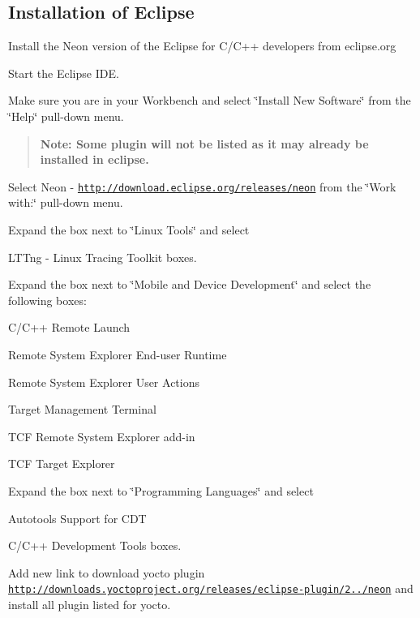 \subsection*{Installation of Eclipse}


\begin{DoxyItemize}
\item Install the Neon version of the Eclipse for C/\+C++ developers from eclipse.\+org
\item Start the Eclipse I\+DE.
\item Make sure you are in your Workbench and select \char`\"{}\+Install New Software\char`\"{} from the \char`\"{}\+Help\char`\"{} pull-\/down menu. \begin{quote}
{\bfseries Note\+: Some plugin will not be listed as it may already be installed in eclipse.} \end{quote}

\item Select Neon -\/ \href{http://download.eclipse.org/releases/neon}{\tt http\+://download.\+eclipse.\+org/releases/neon} from the \char`\"{}\+Work with\+:\char`\"{} pull-\/down menu.
\item Expand the box next to \char`\"{}\+Linux Tools\char`\"{} and select
\begin{DoxyItemize}
\item L\+T\+Tng -\/ Linux Tracing Toolkit boxes.
\end{DoxyItemize}
\item Expand the box next to \char`\"{}\+Mobile and Device Development\char`\"{} and select the following boxes\+:
\begin{DoxyItemize}
\item C/\+C++ Remote Launch
\item Remote System Explorer End-\/user Runtime
\item Remote System Explorer User Actions
\item Target Management Terminal
\item T\+CF Remote System Explorer add-\/in
\item T\+CF Target Explorer   
\end{DoxyItemize}
\item Expand the box next to \char`\"{}\+Programming Languages\char`\"{} and select
\begin{DoxyItemize}
\item Autotools Support for C\+DT
\item C/\+C++ Development Tools boxes. 
\end{DoxyItemize}
\item Add new link to download yocto plugin \href{http://downloads.yoctoproject.org/releases/eclipse-plugin/2.3.2/neon}{\tt http\+://downloads.\+yoctoproject.\+org/releases/eclipse-\/plugin/2../neon} and install all plugin listed for yocto. 
\end{DoxyItemize}

